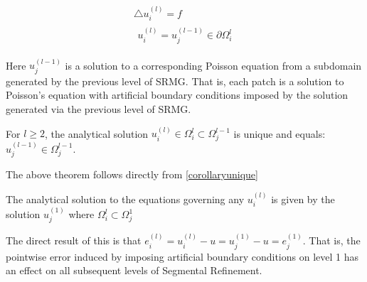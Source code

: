 \documentclass[final]{siamart1116}
\numberwithin{theorem}{section}
\begin{document}
\begin{gather}
  \bigtriangleup u^{(l)}_i = f \nonumber  \\
  \begin{split}
    u^{(l)}_i = u^{(l-1)}_j \in \partial \Omega^{l}_i \label{patchpdel}
  \end{split}
\end{gather}

Here $u^{(l-1)}_j$ is a solution to a corresponding Poisson equation from a subdomain generated by the previous level of SRMG. That is, each patch is a solution to Poisson's equation with artificial boundary conditions imposed by the solution generated via the previous level of SRMG.



\begin{theorem}
For $l \geq 2$, the analytical solution  $u^{(l)}_i \in  \Omega^{l}_i \subset \Omega^{l-1}_j $ is unique and equals:
$u^{(l-1)}_j \in \Omega^{l-1}_j $.  
\end{theorem}

The above theorem follows directly from \ref{corollaryunique}
 



\begin{corollary}
The analytical solution to the equations governing any $u^{(l)}_i$ is given by the solution $u^{(1)}_j$ where $\Omega^{l}_i \subset \Omega^{1}_j$
\end{corollary}

The direct result of this is that $e^{(l)}_i = u^{(l)}_i - u = u^{(1)}_j - u = e^{(1)}_j$. That is, the pointwise error induced by imposing artificial boundary conditions on level 1 has an effect on all subsequent levels of Segmental Refinement. 
\end{document}
